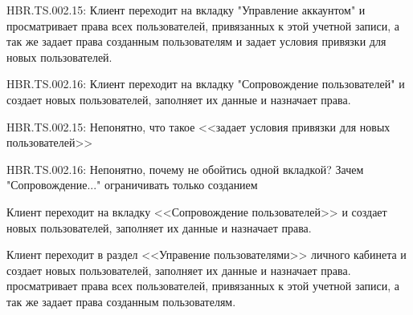 {


\begin{wiki}
HBR.TS.002.15: Клиент переходит на вкладку "Управление аккаунтом" и просматривает права всех пользователей, привязанных к этой учетной записи, а так же задает права созданным пользователям и задает условия привязки для новых пользователей.

HBR.TS.002.16: Клиент переходит на вкладку "Сопровождение пользователей" и создает новых пользователей, заполняет их данные и назначает права.
\end{wiki}


\begin{teamidea}
HBR.TS.002.15: Непонятно, что такое <<задает условия привязки для новых пользователей>>

HBR.TS.002.16: Непонятно, почему не обойтись одной вкладкой? Зачем "Сопровождение..." ограничивать только созданием
\end{teamidea}


\begin{itogo}
Клиент переходит на вкладку <<Сопровождение пользователей>> и создает новых пользователей, заполняет их данные и назначает права.

Клиент переходит в раздел <<Управение пользователями>> личного кабинета и создает новых пользователей, заполняет их данные и назначает права. просматривает права всех пользователей, привязанных к этой учетной записи, а так же задает права созданным пользователям.
\end{itogo}


}




\ifcand
